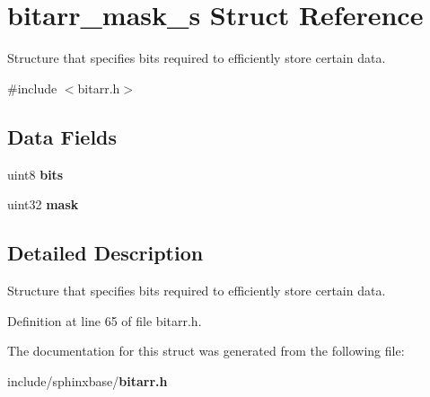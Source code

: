\section{bitarr\-\_\-mask\-\_\-s Struct Reference}
\label{structbitarr__mask__s}


Structure that specifies bits required to efficiently store certain data.  




{\ttfamily \#include $<$bitarr.\-h$>$}

\subsection*{Data Fields}
\begin{DoxyCompactItemize}
\item 
uint8 {\bfseries bits}\label{structbitarr__mask__s_a47b05f707efd5233f021bb1276c79b7a}

\item 
uint32 {\bfseries mask}\label{structbitarr__mask__s_a034b318c56cbc15befef989a2521623c}

\end{DoxyCompactItemize}


\subsection{Detailed Description}
Structure that specifies bits required to efficiently store certain data. 

Definition at line 65 of file bitarr.\-h.



The documentation for this struct was generated from the following file\-:\begin{DoxyCompactItemize}
\item 
include/sphinxbase/{\bf bitarr.\-h}\end{DoxyCompactItemize}
